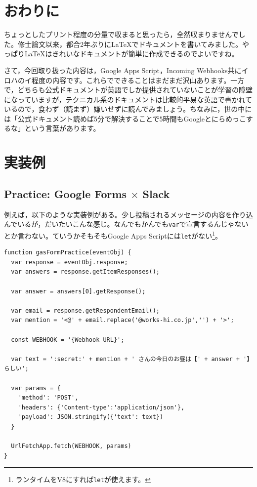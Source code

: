 \documentclass[uplatex,a4j]{jsarticle}
\begin{document}
\section{おわりに}


ちょっとしたプリント程度の分量で収まると思ったら，全然収まりませんでした。修士論文以来，都合2年ぶりに\LaTeX でドキュメントを書いてみました。やっぱり\LaTeX はきれいなドキュメントが簡単に作成できるのでよいですね。


さて，今回取り扱った内容は，Google Apps Script，Incoming Webhooks共にイロハのイ程度の内容です。これらでできることはまだまだ沢山あります。一方で，どちらも公式ドキュメントが英語でしか提供されていないことが学習の障壁になっていますが，テクニカル系のドキュメントは比較的平易な英語で書かれているので，食わず（読まず）嫌いせずに読んでみましょう。ちなみに，世の中には「公式ドキュメント読めば5分で解決することで5時間もGoogleとにらめっこするな」という言葉があります\footnotemark。

\clearpage
\appendix

\section{実装例}

\subsection{Practice: Google Forms $\times$ Slack}

例えば，以下のような実装例がある。少し投稿されるメッセージの内容を作り込んでいるが，だいたいこんな感じ。なんでもかんでも\verb|var|で宣言するんじゃないとか言わない。ていうかそもそもGoogle Apps Scriptには\verb|let|がない\footnote{ランタイムをV8にすれば\verb|let|が使えます。}。

\begin{lstlisting}[basicstyle=\ttfamily\footnotesize,frame=single,caption=Script Example for Forms practice]
function gasFormPractice(eventObj) {
  var response = eventObj.response;
  var answers = response.getItemResponses();
  
  var answer = answers[0].getResponse();
  
  var email = response.getRespondentEmail();
  var mention = '<@' + email.replace('@works-hi.co.jp','') + '>';
  
  const WEBHOOK = '{Webhook URL}';
  
  var text = ':secret:' + mention + ' さんの今日のお昼は【' + answer + '】らしい';
  
  var params = {
    'method': 'POST',
    'headers': {'Content-type':'application/json'},
    'payload': JSON.stringify({'text': text})
  }
  
  UrlFetchApp.fetch(WEBHOOK, params)
}
\end{lstlisting}
\end{document}
